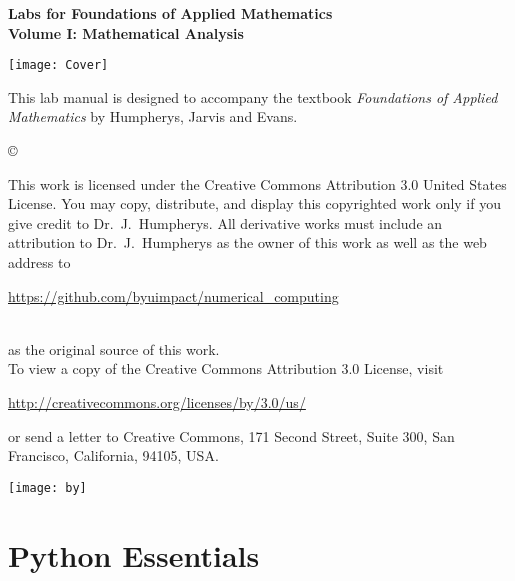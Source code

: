 \documentclass[nociteref]{SIAM-GH-book}
\begin{document}



\thispagestyle{empty}
\begin{center}
 
{\huge \bf Labs for Foundations of Applied Mathematics} \\
\vspace{5mm}
{\Large \bf Volume I: Mathematical Analysis}
\vspace{20mm}

\texttt{[image: Cover]}
\end{center}
\frontmatter




\begin{thepreface}
This lab manual is designed to accompany the textbook \emph{Foundations of Applied Mathematics} by Humpherys, Jarvis and Evans.

\vfill
\copyright{This work is licensed under the Creative Commons Attribution 3.0 United States
License.  You may copy, distribute, and display this copyrighted work only if you give
credit to Dr.~J.~Humpherys. All derivative works must include an attribution to Dr.~J.~Humpherys as the owner of this work as well as the web address to
\\\centerline{\url{https://github.com/byuimpact/numerical_computing}}\\ as the original source of
this
work.\\To view a copy of the Creative Commons Attribution 3.0 License,
visit\\\centerline{\url{http://creativecommons.org/licenses/by/3.0/us/}} or send a letter to
Creative Commons, 171 Second Street, Suite 300, San Francisco, California, 94105, USA.}

\vfill
\centering\texttt{[image: by]}
\vfill
\end{thepreface}

\setcounter{tocdepth}{1}
\tableofcontents

\mainmatter
\part{Python Essentials}
\end{document}
